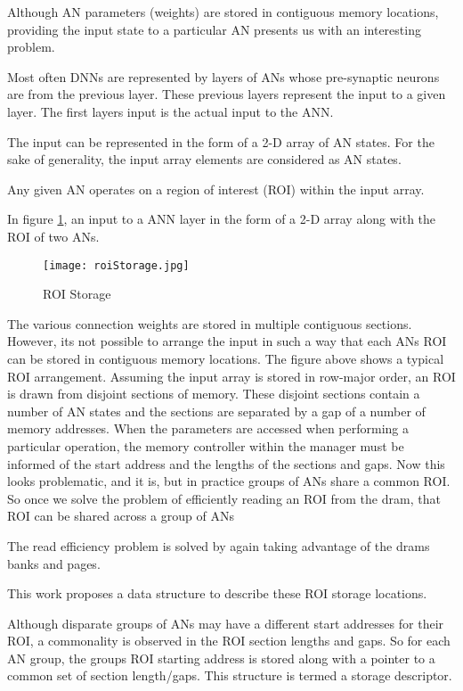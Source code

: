 Although AN parameters (weights) are stored in contiguous memory locations, providing the input state to a particular AN presents us with an interesting problem.

Most often DNNs are represented by layers of ANs whose pre-synaptic neurons are from the previous layer. These previous layers represent the input to a given layer. The first layers input is the actual input to the ANN.


The input can be represented in the form of a 2-D array of AN states. For the sake of generality, the input array elements are considered as AN states.

Any given AN operates on a region of interest (ROI) within the input array.

In figure \ref{fig:roiStorage}, an input to a ANN layer in the form of a 2-D array along with the ROI of two ANs.

\begin{figure}[!t]
\centering
\captionsetup{justification=centering}
\captionsetup{width=.9\linewidth}
\centerline{
\mbox{\texttt{[image: roiStorage.jpg]}}
}
\caption{ROI Storage}
\label{fig:roiStorage}
\end{figure}

The various connection weights are stored in multiple contiguous sections. However, its not possible to arrange the input in such a way that each ANs ROI can be stored in contiguous memory locations. The figure above shows a typical ROI arrangement. Assuming the input array is stored in row-major order, an ROI is drawn from disjoint sections of memory. 
These disjoint sections contain a number of AN states and the sections are separated by a gap of a number of memory addresses. When the parameters are accessed when performing a particular operation, the memory controller within the manager must be informed of the start address and the lengths of the sections and gaps. Now this looks problematic, and it is, but in practice groups of ANs share a common ROI. So once we solve the problem of efficiently reading an ROI from the \ac{dram}, that ROI can be shared across a group of ANs

The read efficiency problem is solved by again taking advantage of the \ac{dram}s banks and pages.

This work proposes a data structure to describe these ROI storage locations.

Although disparate groups of ANs may have a different start addresses for their ROI, a commonality is observed in the ROI section lengths and gaps. So for each AN group, the groups ROI starting address is stored along with a pointer to a common set of section length/gaps. This structure is termed a storage descriptor.

